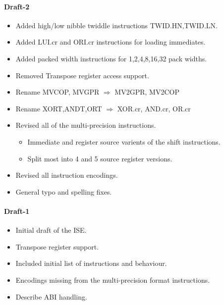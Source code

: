 \paragraph{Draft-2}
\begin{itemize}
\item Added high/low nibble twiddle instructions TWID.HN,TWID.LN.
\item Added LUI.cr and ORI.cr instructions for loading immediates.
\item Added packed width instructions for 1,2,4,8,16,32 pack widths.
\item Removed Transpose register access support.
\item Rename MVCOP, MVGPR  $\Rightarrow$ MV2GPR, MV2COP
\item Rename XORT,ANDT,ORT $\Rightarrow$ XOR.cr, AND.cr, OR.cr
\item Revised all of the multi-precision instructions.
\begin{itemize}
    \item Immediate and register source varients of the shift instructions.
    \item Split most into 4 and 5 source register versions.
\end{itemize}
\item Revised all instruction encodings.
\item General typo and spelling fixes.
\end{itemize}

\paragraph{Draft-1}
\begin{itemize}
\item Initial draft of the ISE.
\item Transpose register support.
\item Included initial list of instructions and behaviour.
\item Encodings missing from the multi-precision format instructions.
\item Describe ABI handling.
\end{itemize}

